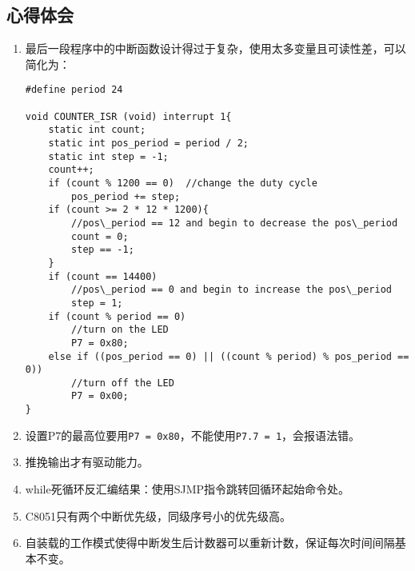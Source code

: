 \begin{spacing}{1.3}
\section{心得体会}
\begin{enumerate}
\item 最后一段程序中的中断函数设计得过于复杂，使用太多变量且可读性差，可以简化为：
\begin{lstlisting}
#define period 24

void COUNTER_ISR (void) interrupt 1{
	static int count;
	static int pos_period = period / 2;
	static int step = -1;
	count++;
	if (count % 1200 == 0)  //change the duty cycle
		pos_period += step; 
	if (count >= 2 * 12 * 1200){  
		//pos\_period == 12 and begin to decrease the pos\_period 
		count = 0;
		step == -1;
	}
	if (count == 14400)  
		//pos\_period == 0 and begin to increase the pos\_period
		step = 1;
	if (count % period == 0)  
		//turn on the LED
		P7 = 0x80;
	else if ((pos_period == 0) || ((count % period) % pos_period == 0))  
		//turn off the LED
		P7 = 0x00;		
}
\end{lstlisting}

\item 设置P7的最高位要用\verb|P7 = 0x80|，不能使用\verb|P7.7 = 1|，会报语法错。

\item 推挽输出才有驱动能力。

\item while死循环反汇编结果：使用SJMP指令跳转回循环起始命令处。

\item C8051只有两个中断优先级，同级序号小的优先级高。

\item 自装载的工作模式使得中断发生后计数器可以重新计数，保证每次时间间隔基本不变。

\end{enumerate}

\end{spacing}

 



